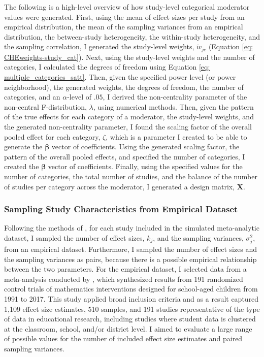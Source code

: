 The following is a high-level overview of how study-level categorical moderator values were generated. First, using the mean of effect sizes per study from an empirical distribution, the mean of the sampling variances from an empirical distribution, the between-study heterogeneity, the within-study heterogeneity, and the sampling correlation, I generated the study-level weights, $\tilde{w}_{jc}$ (Equation \ref{eq: CHEweights-study_cat}). Next, using the study-level weights and the number of categories, I calculated the degrees of freedom using Equation \ref{eq: multiple_categories_satt}. Then, given the specified power level (or power neighborhood), the generated weights, the degrees of freedom, the number of categories, and an $\alpha$-level of $.05$, I derived the non-centrality parameter of the non-central F-distribution, $\lambda$, using numerical methods. Then, given the pattern of the true effects for each category of a moderator, the study-level weights, and the generated non-centrality parameter, I found the scaling factor of the overall pooled effect for each category, $\zeta$, which is a parameter I created to be able to generate the $\bm{\beta}$ vector of coefficients. Using the generated scaling factor, the pattern of the overall pooled effects, and specified the number of categories, I created the $\bm{\beta}$ vector of coefficients. Finally, using the specified values for the number of categories, the total number of studies, and the balance of the number of studies per category across the moderator, I generated a design matrix, $\bm{X}$.


\subsubsection{Sampling Study Characteristics from Empirical Dataset}

Following the methods of \textcite{vembye2023}, for each study included in the simulated meta-analytic dataset, I sampled the number of effect sizes, $k_j$, and the sampling variances, $\sigma_j^2$, from an empirical dataset. Furthermore, I sampled the number of effect sizes and the sampling variances as pairs, because there is a possible empirical relationship between the two parameters. For the empirical dataset, I selected data from a meta-analysis conducted by \textcite{WilliamsRyan2022HiMI}, which synthesized results from 191 randomized control trials of mathematics interventions designed for school-aged children from 1991 to 2017. This study applied broad inclusion criteria and as a result captured 1,109 effect size estimates, 510 samples, and 191 studies representative of the type of data in educational research, including studies where student data is clustered at the classroom, school, and/or district level. I aimed to evaluate a large range of possible values for the number of included effect size estimates and paired sampling variances. 

